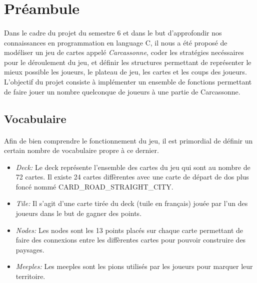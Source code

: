\documentclass[12pt]{article}
\begin{document}
\section{Préambule}

\paragraph{} Dans le cadre du projet du semestre 6 et dans le but d'approfondir nos connaissances en programmation en language C, il nous a été proposé de modéliser un jeu de cartes appelé \textit{Carcassonne}, coder les stratégies necéssaires pour le déroulement du jeu, et définir les structures permettant de représenter le mieux possible les joueurs, le plateau de jeu, les cartes et les coups des joueurs.
L'objectif du projet consiste à implémenter un ensemble de fonctions permettant de faire jouer un nombre quelconque de joueurs à une partie de Carcassonne.

\subsection{Vocabulaire}
\paragraph{} Afin de bien comprendre le fonctionnement du jeu, il est primordial de définir un certain nombre de vocabulaire propre à ce dernier. \\

\begin{itemize}
\item \textit{Deck:} Le deck représente l'ensemble des cartes du jeu qui sont au nombre de 72 cartes. Il existe 24 cartes diffèrentes avec une carte de départ de dos plus foncé nommé CARD\_ROAD\_STRAIGHT\_CITY.\\
\item\textit{Tile:} Il s'agit d'une carte tirée du deck (tuile en français) jouée par l'un des joueurs dans le but de gagner des points.\\
\item\textit{Nodes:}
Les nodes sont les 13 points placés sur chaque carte permettant de faire des connexions entre les diffèrentes cartes pour pouvoir construire des paysages.\\
\item\textit{Meeples:}
Les meeples sont les pions utilisés par les joueurs pour marquer leur territoire.
\end{itemize}
\end{document}
